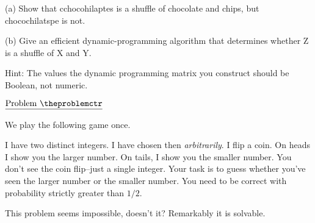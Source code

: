 \documentclass[11pt]{article}
\def\pp{\par\noindent}
\begin{document}
\noindent(a) Show that cchocohilaptes is a shuffle of chocolate and chips,
but chocochilatspe is not.

\noindent(b) Give an efficient dynamic-programming algorithm that
determines
whether Z is a shuffle of X and Y.

\noindent Hint: The values the dynamic programming matrix you construct
should
be Boolean, not numeric.


\addtocounter{problemctr}{1}
\bigskip
\noindent
$\underline{\rm Problem\ \theproblemctr}$\pp
We play the following game once. 

I have two distinct integers. I have chosen then \emph{arbitrarily}. 
I flip a coin. On heads I show you the larger number. On tails, I show you the smaller number. You don't see the coin flip--just a single integer. Your task is to guess whether you've seen the larger number or the smaller number.
You need to be correct with probability strictly greater than $1/2$. 

This problem seems impossible, doesn't it? Remarkably it is solvable. 


\iffalse


\addtocounter{problemctr}{1}
\bigskip
\noindent
$\underline{\rm Problem\ \theproblemctr}$\pp {\em From Cormen,
Leiserson, Rivest,page 315\/}\pp Give an $O(n^2)$-time algorithm
to find the longest monotonically increasing subsequence of a
sequence of $n$ numbers.


\addtocounter{problemctr}{1}
\bigskip
\noindent
$\underline{\rm Problem\ \theproblemctr}$\pp
{\em From Cormen,
Leiserson, Rivest
 (Extra Credit)\/}\pp
Give an $O(n \log n)$-time algorithm to find the longest
monotonically increasing subsequence of a sequence of $n$ numbers.
({\em Hint:\/} Observe that the last element of a candidate
subsequence of length $i$ is at least as large as the last element
of a candidate subsequence of length $i - 1$. Maintain candidate
subsequences by linking them through the input sequence.)\\


\fi

\iffalse

\addtocounter{problemctr}{1}
\bigskip
\noindent
$\underline{\rm Problem\ \theproblemctr}$\pp
\pp
In a small stadium there are several thousand people in the stands. Devise a
distributed algorithm enabling the audience to count itself. Do not assume any
particular geometry of the stadium, except, if you want, that it is bowl shaped.
Explicitly state your assumptions, then present your algorithm and analysis.


\fi
\end{document}
